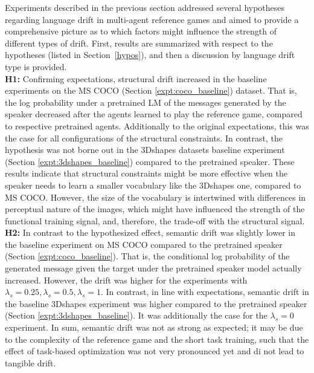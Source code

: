Experiments described in the previous section addressed several hypotheses regarding language drift in multi-agent reference games and aimed to provide a comprehensive picture as to which factors might influence the strength of different types of drift.
First, results are summarized with respect to the hypotheses (listed in Section~\ref{hypos}), and then a discussion by language drift type is provided.\\
\newline
\textbf{H1:} Confirming expectations, structural drift increased in the baseline experiments on the MS COCO (Section \ref{expt:coco_baseline}) dataset. That is, the log probability under a pretrained LM of the messages generated by the speaker decreased after the agents learned to play the reference game, compared to respective pretrained agents. Additionally to the original expectations, this was the case for all configurations of the structural constraints. In contrast, the hypothesis was not borne out in the 3Dshapes datasets baseline experiment (Section \ref{expt:3dshapes_baseline}) compared to the pretrained speaker. These results indicate that structural constraints might be more effective when the speaker needs to learn a smaller vocabulary like the 3Dshapes one, compared to MS COCO. However, the size of the vocabulary is intertwined with differences in perceptual nature of the images, which might have influenced the strength of the functional training signal, and, therefore, the trade-off with the structural signal.\newline
\textbf{H2:} In contrast to the hypothesized effect, semantic drift was slightly lower in the baseline experiment on MS COCO compared to the pretrained speaker (Section \ref{expt:coco_baseline}). That is, the conditional log probability of the generated message given the target under the pretrained speaker model actually increased. However, the drift was higher for the experiments with $\lambda_s=0.25, \lambda_s=0.5, \lambda_s=1$. In contrast, in line with expectations, semantic drift in the baseline 3Dshapes experiment was higher compared to the pretrained speaker (Section \ref{expt:3dshapes_baseline}). It was additionally the case for the $\lambda_s=0$ experiment. In sum, semantic drift was not as strong as expected; it may be due to the complexity of the reference game and the short task training, such that the effect of task-based optimization was not very pronounced yet and di not lead to tangible drift. \newline
